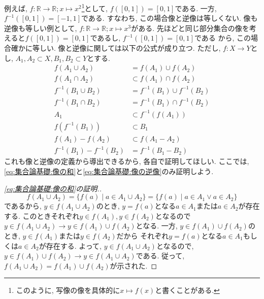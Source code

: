         例えば, $f:\mathbb{R}\rightarrow \mathbb{R};x\mapsto x^2$\footnote{このように, 写像の像を具体的に$x\mapsto f(x)$と書くことがある.}として, $f([0,1])=[0,1]$である. 一方, $f^{-1}([0,1])=[-1,1]$である. 
        すなわち, この場合像と逆像は等しくない. 像も逆像も等しい例として, $f:\mathbb{R}\rightarrow \mathbb{R};x\mapsto x^3$がある. 先ほどと同じ部分集合の像を考えると$f([0,1])=[0,1]$であるし, $f^{-1}([0,1])=[0,1]$である
        から, この場合確かに等しい.
        \clearpage
        像と逆像に関しては以下の公式が成り立つ. ただし, $f:X\rightarrow Y$とし, $A_1,A_2\subset X,B_1,B_2\subset Y$とする.
        \begin{align}
            f(A_1 \cup A_2)&=f(A_1)\cup f(A_2) \label{eq:集合論基礎:像の和}\\
            f(A_1 \cap A_2)&\subset f(A_1)\cap f(A_2) \label{eq:集合論基礎:像の積}\\
            f^{-1}(B_1 \cup B_2)&=f^{-1}(B_1)\cup f^{-1}(B_2) \label{eq:集合論基礎:逆像の和}\\    
            f^{-1}(B_1 \cap B_2)&=f^{-1}(B_1)\cap f^{-1}(B_2) \label{eq:集合論基礎:逆像の積}\\    
            A_1 &\subset f^{-1}(f(A_1)) \label{eq:集合論基礎:像の逆像}\\
            f(f^{-1}(B_1)) &\subset B_1 \label{eq:集合論基礎:逆像の像}\\
            f(A_1)-f(A_2) &\subset f(A_1-A_2) \label{eq:集合論基礎:像の差}\\
            f^{-1}(B_1)-f^{-1}(B_2) &= f^{-1}(B_1-B_2) \label{eq:集合論基礎:逆像の差}
        \end{align}
        これも像と逆像の定義から導出できるから, 各自で証明してほしい. ここでは, \eqref{eq:集合論基礎:像の和}と\eqref{eq:集合論基礎:像の逆像}のみ証明しよう.
        \begin{proof}[\eqref{eq:集合論基礎:像の和}の証明.]
            \begin{equation*}
                f(A_1\cup A_2)=\{f(a)\mid a\in A_1\cup A_2\}=\{f(a)\mid a\in A_1\lor a\in A_2\}
            \end{equation*}
            であるから, $y\in f(A_1\cup A_2)$のとき, $y=f(a)$となる$a\in A_1$または$a\in A_2$が存在する. このときそれぞれ$y\in f(A_1),y\in f(A_2)$となるので
            $y\in f(A_1\cup A_2)\rightarrow y\in f(A_1)\cup f(A_2)$となる. 一方, $y\in f(A_1)\cup f(A_2)$のとき, $y\in f(A_1)$または$y\in f(A_2)$だから
            それぞれ$y=f(a)$となる$a\in A_1$もしくは$a\in A_2$が存在する. よって, $y\in f(A_1\cup A_2)$となるので, $y\in f(A_1)\cup f(A_2)\rightarrow y\in f(A_1\cup A_2)$である.
            従って, $f(A_1\cup A_2)=f(A_1)\cup f(A_2)$が示された.
        \end{proof}
